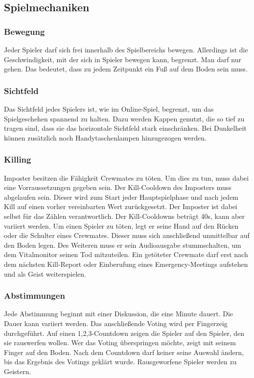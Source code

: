 \subsection{Spielmechaniken}
\subsubsection{Bewegung}
Jeder Spieler darf sich frei innerhalb des Spielbereichs bewegen. Allerdings
ist die Geschwindigkeit, mit der sich in Spieler bewegen kann, begrenzt. Man
darf nur gehen. Das bedeutet, dass zu jedem Zeitpunkt ein Fuß auf dem Boden sein
muss.

\subsubsection{Sichtfeld}
Das Sichtfeld jedes Spielers ist, wie im Online-Spiel, begrenzt, um das
Spielgeschehen spannend zu halten. Dazu werden Kappen genutzt, die so
tief zu tragen sind, dass sie das horizontale Sichtfeld stark einschränken. Bei
Dunkelheit können zusätzlich noch Handytaschenlampen hinzugezogen werden.

\subsubsection{Killing}
Imposter besitzen die Fähigkeit Crewmates zu töten. Um dies zu tun, muss dabei
eine Vorraussetzungen gegeben sein. Der Kill-Cooldown des Imposters muss
abgelaufen sein. Dieser wird zum Start jeder Hauptspielphase und nach jedem Kill
auf einen vorher vereinbarten Wert zurückgesetzt. Der Imposter ist dabei selbst
für das Zählen verantwortlich. Der Kill-Cooldowns beträgt 40s, kann aber
variiert werden.
\newline
Um einen Spieler zu töten, legt er seine Hand auf den Rücken oder die Schulter
eines Crewmates. Dieser muss sich anschließend unmittelbar auf den Boden legen.
Des Weiteren muss er sein Audioausgabe stummschalten, um dem Vitalmonitor seinen
Tod mitzuteilen.
\newline
Ein getöteter Crewmate darf erst nach dem nächsten Kill-Report oder Einberufung
eines Emergency-Meetings aufstehen und als Geist weiterspielen.

\subsubsection{Abstimmungen}
Jede Abstimmung beginnt mit einer Diskussion, die eine Minute dauert. Die Dauer
kann variiert werden.
Das anschließende Voting wird per Fingerzeig durchgeführt. Auf
einen 1,2,3-Countdown zeigen die Spieler auf den Spieler, den sie
rauswerfen wollen. Wer das Voting überspringen möchte, zeigt mit seinem Finger
auf den Boden. Nach dem Countdown darf keiner seine Auswahl ändern, bis das
Ergebnis des Votings geklärt wurde.
\newline
Rausgeworfene Spieler werden zu Geistern.

